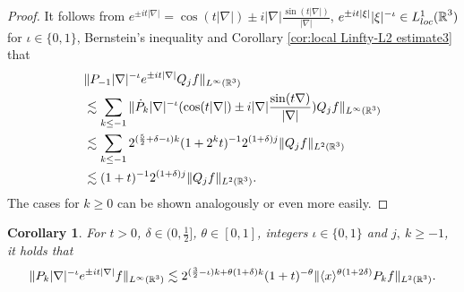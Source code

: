 \documentclass[11pt,twoside]{article}
\def\R{\mathop{\mathbb R\kern 0pt}\nolimits}
\def\f{\frac}
\def\ls{\lesssim}
\newcommand{\w}[1]{\langle {#1} \rangle}
\theoremstyle{plain}
\newtheorem{cor}[theorem]{Corollary}
\theoremstyle{definition}
\numberwithin{equation}{section}
\begin{document}
	\begin{proof}
		It follows from $e^{\pm it|\nabla|} = \cos(t|\nabla|)\pm i|\nabla|\f{\sin(t|\nabla|)}{|\nabla|}$,
	$e^{\pm it|\xi|}|\xi|^{-\iota}\in L^1_{loc}(\R^3)$ for $\iota\in\{0,1\}$, Bernstein's inequality and
Corollary \ref{cor:local Linfty-L2 estimate3} that
		\begin{equation*}
			\begin{split}
				&\|P_{-1}|\nabla|^{-\iota}e^{\pm it|\nabla|}Q_j  f\|_{L^\infty(\R^3)} \\
				&\ls
				\sum_{k\le-1}\|\dot{P}_{k}|\nabla|^{-\iota}(\cos(t|\nabla|)\pm i|\nabla|\f{\sin(t\nabla)}{|\nabla|})Q_j  f\|_{L^\infty(\R^3)} \\
				&\ls
				\sum_{k\le-1}2^{(\f52+\delta-\iota) k}(1+2^kt)^{-1} 2^{(1+\delta)j}\| Q_j f\|_{L^2(\R^3)}\\
				&\ls
				(1+t)^{-1}2^{(1+\delta)j}\| Q_j f\|_{L^2(\R^3)}.
			\end{split}
		\end{equation*}
		The  cases for $k\ge 0$ can be shown analogously or even more easily.
	\end{proof}
	\begin{cor}\label{cor:3.8}
		For $t>0$, $\delta\in(0,\f12]$, $\theta\in[0,1]$, integers $\iota\in\{0,1\}$ and $j,\ k\ge -1$, it holds that
		\begin{equation}\label{ineq:cor 3.8}
			\|P_{k}|\nabla|^{-\iota}e^{\pm it|\nabla|} f\|_{L^\infty(\R^3)}
			\ls
			2^{(\f32-\iota) k+\theta(1+\delta)k}(1+t)^{-\theta}\| \w{x}^{\theta(1+2\delta)} P_kf\|_{L^2(\R^3)}.
		\end{equation}
	\end{cor}
\end{document}
